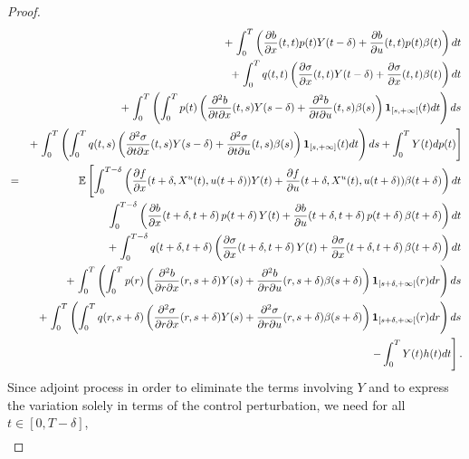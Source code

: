 \documentclass[12pt]{article}
\theoremstyle{remark}
\numberwithin{equation}{section}
\begin{document}
\begin{proof}
\begin{eqnarray*}
&&+\left.\int_0^T\left(\frac{\partial b}{\partial x}(t, t)p(t) Y(t-\delta)+\frac{\partial b}{\partial u}(t, t)p(t) \beta(t)\right)dt\right.\nonumber\\
&&+\left.\int_{0}^{T}q(t,t)\left( \frac{\partial \sigma}{\partial x}(t,t)Y(t-\delta) + \frac{\partial \sigma}{\partial x}(t,t)\beta(t)\right)dt\right.\\
&&+ \left. \int_0^T \left( \int_0^T p(t) \left(\frac{\partial^{2}
	b}{\partial t \partial x}(t, s)Y(s-\delta)+\frac{\partial^{2}
		b}{\partial t \partial u}(t, s)\beta(s)\right){\bf 1 }_{[s,+\infty[}(t)dt\right)ds \right.\nonumber\\
&&+\left.\int_0^T \left( \int_0^T q(t,s)\left(\frac{\partial^{2} \sigma}{\partial t \partial x}(t, s)Y(s-\delta)+\frac{\partial^{2} \sigma}{\partial t \partial u}(t, s)\beta(s)\right){\bf 1 }_{[s,+\infty]}(t)dt \right) ds+\int_{0}^{T}Y(t)dp(t)\right]\\
&=&\mathbb{E}\left[\int_{0}^{T-\delta}\left(\frac{\partial f}{\partial x}(t+\delta,X^{u}(t),u(t+\delta))Y(t)+\frac{\partial f}{\partial u}(t+\delta,X^{u}(t),u(t+\delta))\beta(t+\delta)\right)dt\right.\\
&&\left.\int_0^{T-\delta}\left(\frac{\partial b}{\partial x}(t+\delta, t+\delta)\,p(t+\delta)\,Y(t)+\frac{\partial b}{\partial u}(t+\delta, t+\delta)\,p(t+\delta)\, \beta(t+\delta)\right)dt\right.\nonumber\\
&&+\left.\int_{0}^{T-\delta}q(t+\delta,t+\delta)\left( \frac{\partial \sigma}{\partial x}(t+\delta,t+\delta)\,Y(t) + \frac{\partial \sigma}{\partial x}(t+\delta,t+\delta)\,\beta(t+\delta)\right)dt\right.\\
&&+\left.\int_0^T \left( \int_0^T p(r) \left(\frac{\partial^{2}
	b}{\partial r \partial x}(r, s+\delta)Y(s)+\frac{\partial^{2}
		b}{\partial r \partial u}(r, s+\delta)\beta(s+\delta)\right){\bf 1 }_{[s+\delta,+\infty[}(r)dr\right)ds \right.\nonumber\\
&&+\left.\int_0^T \left( \int_0^T q(r,s+\delta)\left(\frac{\partial^{2} \sigma}{\partial r \partial x}(r, s+\delta)Y(s)+\frac{\partial^{2} \sigma}{\partial r \partial u}(r, s+\delta)\beta(s+\delta)\right){\bf 1 }_{[s+\delta,+\infty[}(r)dr \right) ds\right.\\
&&\left.-\int_{0}^{T}Y(t)h(t)dt\right].
\end{eqnarray*}
Since adjoint process in order to eliminate the terms involving $Y$ and to express the variation solely in terms of the control perturbation, we need for all $t\in [0,T-\delta]$,
\begin{eqnarray*}

\end{eqnarray*}
\end{proof}
\end{document}
